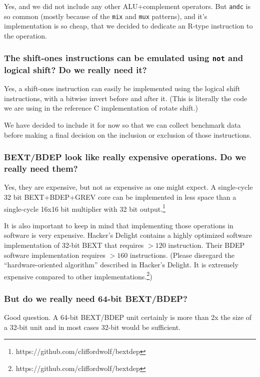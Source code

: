 Yes, and we did not include any other ALU+complement operators. But \texttt{andc}
is so common (mostly because of the \texttt{mix} and \texttt{mux} patterns), and
it's implementation is so cheap, that we decided to dedicate an R-type instruction
to the operation.

\subsubsection{The shift-ones instructions can be emulated using {\tt not} and logical shift? Do we really need it?}

Yes, a shift-ones instruction can easily be implemented using the logical shift
instructions, with a bitwise invert before and after it. (This is literally the
code we are using in the reference C implementation of rotate shift.)

We have decided to include it for now so that we can collect benchmark data before
making a final decision on the inclusion or exclusion of those instructions.

\subsubsection{BEXT/BDEP look like really expensive operations. Do we really need them?}

Yes, they are expensive, but not as expensive as one might expect. A
single-cycle 32 bit BEXT+BDEP+GREV core can be implemented in less space than a
single-cycle 16x16 bit multiplier with 32 bit output.\footnote{https://github.com/cliffordwolf/bextdep}

It is also important to keep in mind that implementing those operations in
software is very expensive. Hacker's Delight contains a highly optimized
software implementation of 32-bit BEXT that requires $>120$ instruction. Their
BDEP software implementation requires $>160$ instructions. (Please disregard the
``hardware-oriented algorithm'' described in Hacker's Delight. It is
extremely expensive compared to other implementations.\footnote{https://github.com/cliffordwolf/bextdep})

\subsubsection{But do we really need 64-bit BEXT/BDEP?}

Good question. A 64-bit BEXT/BDEP unit certainly is more than 2x the size of a
32-bit unit and in most cases 32-bit would be sufficient.

